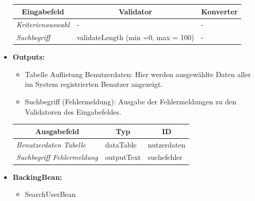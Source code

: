 \begin{itemize}
				\begin{center}
					\begin{longtable}{|p{3cm} |p{8cm} | p{5cm}|}
						
						\hline \multicolumn{1}{|c|}{\textbf{Eingabefeld}} & \multicolumn{1}{|c|}{\textbf{Validator}} & \multicolumn{1}{|c|}{\textbf{Konverter}} \\ \hline
						\endfirsthead
						\hline
						\endlastfoot
						\textit{Kriterienauswahl} & - & - \\ \hline
						\textit{Suchbegriff} & validateLength (min =0, max = 100) & - \\ \hline
					\end{longtable}
				\end{center}
				
			\item \textbf{Outputs:}
				\begin{itemize}
					\item Tabelle Auflistung Benutzerdaten: Hier werden ausgewählte Daten aller im System registrierten Benutzer angezeigt.
					\item Suchbegriff (Fehlermeldung): Ausgabe der Fehlermeldungen zu den Validatoren des Eingabefeldes.
				\end{itemize}
				
					\begin{center}
						\begin{longtable}{|p{5cm} | p{4cm}|p{3cm}|}
							
							\hline \multicolumn{1}{|c|}{\textbf{Ausgabefeld}} & \multicolumn{1}{|c|}{\textbf{Typ}}  &  \multicolumn{1}{|c|}{\textbf{ID}} \\ \hline
							\endfirsthead
							\hline
							\endlastfoot
							\textit{Benutzerdaten Tabelle}  & dataTable & nutzerdaten \\ \hline
							\textit{Suchbegriff Fehlermeldung}  & outputText & suchefehler \\ \hline
						\end{longtable}
					\end{center}
				
			\item \textbf{BackingBean:}
				\begin{itemize}
					\item SearchUserBean
				\end{itemize}
		\end{itemize}
		
